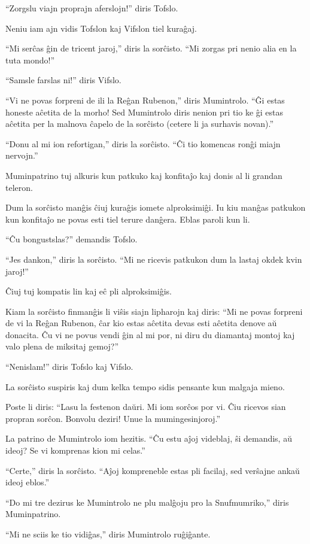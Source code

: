 ``Zorgslu viajn proprajn aferslojn!'' diris Tofslo.

Neniu iam ajn vidis Tofslon kaj Vifslon tiel kuraĝaj.

``Mi serĉas ĝin de tricent jaroj,'' diris la sorĉisto. ``Mi zorgas pri nenio alia en la tuta mondo!''

``Samsle farslas ni!'' diris Vifslo.

``Vi ne povas forpreni de ili la Reĝan Rubenon,'' diris Mumintrolo. ``Ĝi estas honeste aĉetita de la morho! Sed Mumintrolo diris nenion pri tio ke ĝi estas aĉetita per la malnova ĉapelo de la sorĉisto (cetere li ja surhavis novan).''

``Donu al mi ion refortigan,'' diris la sorĉisto. ``Ĉi tio komencas ronĝi miajn nervojn.''

Muminpatrino tuj alkuris kun patkuko kaj konfitaĵo kaj donis al li grandan teleron.

Dum la sorĉisto manĝis ĉiuj kuraĝis iomete alproksimiĝi. Iu kiu manĝas patkukon kun konfitaĵo ne povas esti tiel terure danĝera. Eblas paroli kun li.

``Ĉu bongustslas?'' demandis Tofslo.

``Jes dankon,'' diris la sorĉisto. ``Mi ne ricevis patkukon dum la lastaj okdek kvin jaroj!''

Ĉiuj tuj kompatis lin kaj eĉ pli alproksimiĝis.

Kiam la sorĉisto finmanĝis li viŝis siajn lipharojn kaj diris: ``Mi ne povas forpreni de vi la Reĝan Rubenon, ĉar kio estas aĉetita devas esti aĉetita denove aŭ donacita. Ĉu vi ne povus vendi ĝin al mi por, ni diru du diamantaj montoj kaj valo plena de miksitaj gemoj?''

``Nenislam!'' diris Tofslo kaj Vifslo.

La sorĉisto suspiris kaj dum kelka tempo sidis pensante kun malgaja mieno.

Poste li diris: ``Lasu la festenon daŭri. Mi iom sorĉos por vi. Ĉiu ricevos sian propran sorĉon. Bonvolu deziri! Unue la mumingesinjoroj.''

La patrino de Mumintrolo iom hezitis. ``Ĉu estu aĵoj videblaj, ŝi demandis, aŭ ideoj? Se vi komprenas kion mi celas.''

``Certe,'' diris la sorĉisto. ``Aĵoj kompreneble estas pli facilaj, sed verŝajne ankaŭ ideoj eblos.''

``Do mi tre dezirus ke Mumintrolo ne plu malĝoju pro la Snufmumriko,'' diris Muminpatrino.

``Mi ne sciis ke tio vidiĝas,'' diris Mumintrolo ruĝiĝante.


